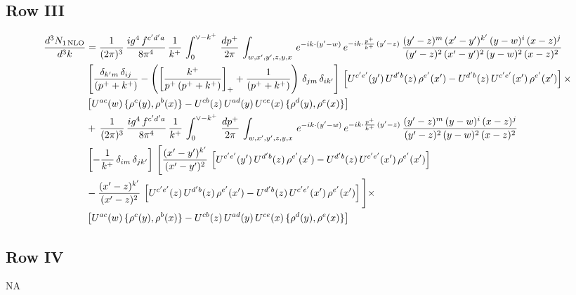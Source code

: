 \documentclass[9pt]{article}
\numberwithin{equation}{section}
\begin{document}
\subsection{Row III}
\begin{align}
     \frac{d^{3}N_{1\,\rm NLO}}{d^{3}k} & =  \frac{1}{(2\pi)^{3}}\, \frac{ig^{4}\,f^{c'd'a}}{8\pi^{4}}\, \frac{1}{k^{+}}\,\int_{0}^{\vee-k^{+}}\,  \frac{dp^{+}}{2\pi}\, \int_{w,x',y',z,y,x}\, e^{-ik\cdot (y'-w)}\, e^{-ik\cdot \frac{p^{+}}{k^{+}}\,(y'-z)}\,\frac{(y'-z)^{m}\,(x'-y')^{k'}\,(y-w)^{i}\,(x-z)^{j}}{(y'-z)^{2}\,(x'-y')^{2}\,(y-w)^{2}\,(x-z)^{2}}\notag \\ & \left[\frac{\delta_{k'm}\,\delta_{ij}}{(p^{+}+k^{+})}-\left(\left[\frac{k^{+}}{p^{+}\,(p^{+}+k^{+})}\right]_{+}+\frac{1}{(p^{+}+k^{+})}\right)\,\delta_{jm}\,\delta_{ik'}\right]\, \left[U^{c'e'}(y')\,U^{d'b}(z)\,\rho^{e'}(x')-U^{d'b}(z)\,U^{c'e'}(x')\,\rho^{e'}(x')\right]\times\notag \\ &  \left[U^{ac}(w)\, \{\rho^{c}(y),\rho^{b}(x)\}-U^{cb}(z)\,U^{ad}(y)\,U^{ce}(x)\,\{\rho^{d}(y),\rho^{e}(x)\}\right] \notag \\
&  +\,\frac{1}{(2\pi)^{3}}\, \frac{ig^{4}\,f^{c'd'a}}{8\pi^{4}}\, \frac{1}{k^{+}}\,\int_{0}^{\vee-k^{+}}\,  \frac{dp^{+}}{2\pi}\, \int_{w,x',y',z,y,x}\, e^{-ik\cdot (y'-w)}\, e^{-ik\cdot \frac{p^{+}}{k^{+}}\,(y'-z)}\,\frac{(y'-z)^{m}\,(y-w)^{i}\,(x-z)^{j}}{(y'-z)^{2}\,(y-w)^{2}\,(x-z)^{2}}\notag \\ &   \left[-\frac{1}{k^{+}}\, \delta_{im}\, \delta_{jk'}\right]\, \Bigg[\frac{(x'-y')^{k'}}{(x'-y')^{2}}\,\left[U^{c'e'}(y')\,U^{d'b}(z)\,\rho^{e'}(x')-U^{d'b}(z)\,U^{c'e'}(x')\,\rho^{e'}(x')\right]\notag \\ & -\frac{(x'-z)^{k'}}{(x'-z)^{2}}\,\left[U^{c'e'}(z)\,U^{d'b}(z)\,\rho^{e'}(x')-U^{d'b}(z)\,U^{c'e'}(x')\,\rho^{e'}(x')\right]\Bigg]\times\notag \\ &   \left[U^{ac}(w)\, \{\rho^{c}(y),\rho^{b}(x)\}-U^{cb}(z)\,U^{ad}(y)\,U^{ce}(x)\,\{\rho^{d}(y),\rho^{e}(x)\}\right]
\end{align}
\subsection{Row IV}
\textsc{NA}
\end{document}
